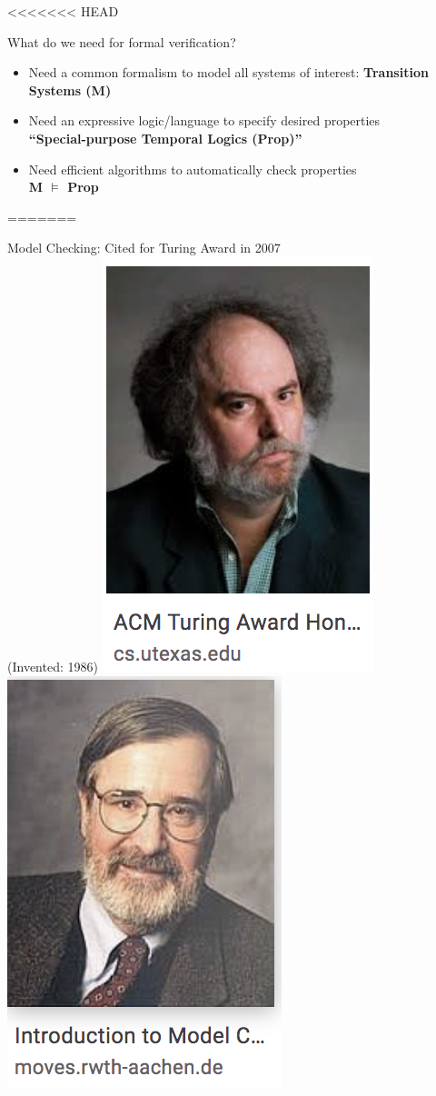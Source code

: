 \documentclass{beamer}
\begin{document}
<<<<<<< HEAD
\begin{frame}{What do we need for formal verification?}
\begin{itemize}
\item<1-> Need a common formalism to model all systems of interest:
\textbf{Transition Systems (M)}

\item<2-> Need an expressive logic/language to specify desired properties \\
\textbf{``Special-purpose Temporal Logics (Prop)''}

\item<3-> Need efficient algorithms to automatically check properties \\
\textbf{M $\models$ Prop}
\end{itemize}
=======
\begin{frame}{Model Checking: Cited for Turing Award in 2007 \\
(Invented: 1986)}
\includegraphics[scale=0.4]{pics/allen.png}\hfill
\includegraphics[scale=0.4]{pics/clarke.png}\hfill

\end{frame}
\end{frame}
\end{document}
